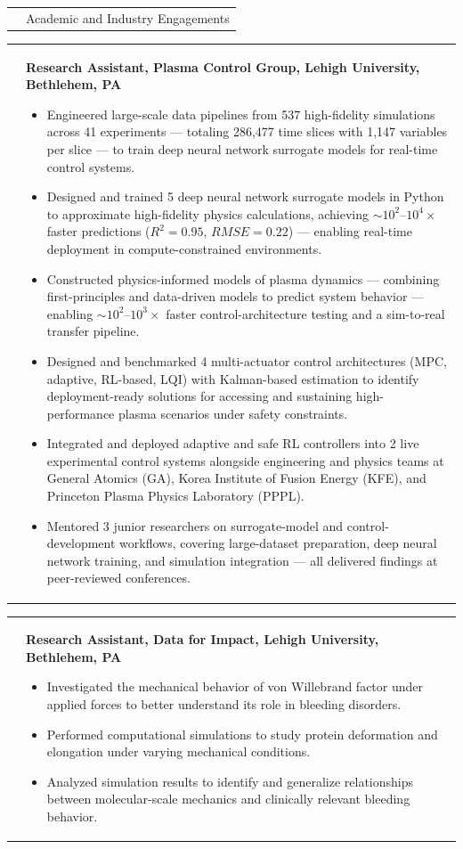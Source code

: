 \documentclass[11pt,letterpaper]{article}
\makeatletter
\newcommand{\CVSection}[1]{%
  \vspace{0.4em}
  \noindent
  \begin{tabularx}{\textwidth}{@{}p{0.82in}@{\hspace{0.14in}}X@{}}
    \raisebox{-1.45ex}{\color{rulecolor}\rule{0.82in}{4.2pt}} &
    {\fontsize{14}{16}\selectfont\color{cvcolor}#1}\\
  \end{tabularx}
  \vspace{0.55em}
}
\newcommand{\CVItem}[2]{%
  \begin{tabularx}{\textwidth}{@{}p{0.83in}@{\hspace{0.15in}}X@{}}
    \raggedleft{#1} & #2\\[3pt]
  \end{tabularx}
}
\makeatother
\begin{document}
\CVSection{Academic and Industry Engagements}
\CVItem{\hspace{-5mm}\mbox{2020--Ongoing}}{\textbf{Research Assistant, Plasma Control Group, Lehigh University, Bethlehem, PA}
\begin{itemize}
  \item Engineered large-scale data pipelines from 537 high-fidelity simulations across 41 experiments --- totaling 286{,}477 time slices with 1{,}147 variables per slice --- to train deep neural network surrogate models for real-time control systems.
  \item Designed and trained 5 deep neural network surrogate models in Python to approximate high-fidelity physics calculations, achieving $\sim\!10^2$--$10^4\times$ faster predictions ($R^2 = 0.95$, $RMSE = 0.22$) --- enabling real-time deployment in compute-constrained environments.
  \item Constructed physics-informed models of plasma dynamics --- combining first-principles and data-driven models to predict system behavior  --- enabling $\sim\!10^2$--$10^3\times$ faster control-architecture testing and a sim-to-real transfer pipeline.
  \item Designed and benchmarked 4 multi-actuator control architectures (MPC, adaptive, RL-based, LQI) with Kalman-based estimation to identify deployment-ready solutions for accessing and sustaining high-performance plasma scenarios under safety constraints.
  \item Integrated and deployed adaptive and safe RL controllers into 2 live experimental control systems alongside engineering and physics teams at General Atomics (GA), Korea Institute of Fusion Energy (KFE), and Princeton Plasma Physics Laboratory (PPPL).
  \item Mentored 3 junior researchers on surrogate-model and control-development workflows, covering large-dataset preparation, deep neural network training, and simulation integration --- all delivered findings at peer-reviewed conferences.
\end{itemize}
}
\CVItem{\hspace{-5mm}\mbox{June--Aug 2020}}{\textbf{Research Assistant, Data for Impact, Lehigh University, Bethlehem, PA} \begin{itemize}
  \item Investigated the mechanical behavior of von Willebrand factor under applied forces to better understand its role in bleeding disorders.
  \item Performed computational simulations to study protein deformation and elongation under varying mechanical conditions.
  \item Analyzed simulation results to identify and generalize relationships between molecular-scale mechanics and clinically relevant bleeding behavior.
\end{itemize}}
\end{document}
